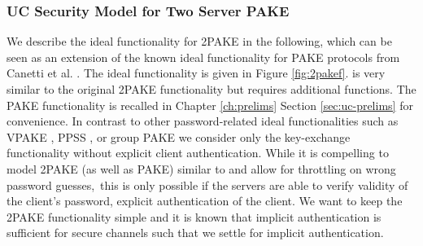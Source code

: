 \subsubsection{UC Security Model for Two Server PAKE}\label{sec:2pakesecurity}
We describe the ideal functionality for \ac{2PAKE} in the following, which can be seen as an extension of the known ideal functionality for \ac{PAKE} protocols from Canetti et al. \cite{Canetti2005}.
The ideal functionality \FTWOPAKE is given in Figure \ref{fig:2pakef}.
\FTWOPAKE is very similar to the original \ac{2PAKE} functionality but requires additional functions.
The \ac{PAKE} functionality is recalled in Chapter \ref{ch:prelims} Section \ref{sec:uc-prelims} for convenience.
In contrast to other password-related ideal functionalities such as \ac{VPAKE} \cite{Gentry2006}, \ac{PPSS} \cite{Camenisch2012}, or group \ac{PAKE} \cite{AbdallaCGP11} we consider only the key-exchange functionality without explicit client authentication.
While it is compelling to model \ac{2PAKE} (as well as \ac{PAKE}) similar to \cite{Camenisch2012} and allow for throttling on wrong password guesses,\footnotemark\ this is only possible if the servers are able to verify validity of the client's password, \ie explicit authentication of the client.
We want to keep the \ac{2PAKE} functionality simple and it is known that implicit authentication is sufficient for secure channels \cite{CanettiK01} such that we settle for implicit authentication.


